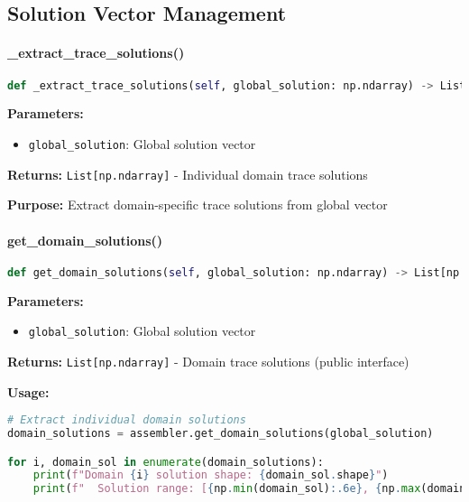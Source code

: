 \subsection{Solution Vector Management}
\label{subsec:solution_vector_management}

\paragraph{\_extract\_trace\_solutions()}\leavevmode
\begin{lstlisting}[language=Python, caption=Extract Trace Solutions Method]
def _extract_trace_solutions(self, global_solution: np.ndarray) -> List[np.ndarray]
\end{lstlisting}

\textbf{Parameters:}
\begin{itemize}
    \item \texttt{global\_solution}: Global solution vector
\end{itemize}

\textbf{Returns:} \texttt{List[np.ndarray]} - Individual domain trace solutions

\textbf{Purpose:} Extract domain-specific trace solutions from global vector

\paragraph{get\_domain\_solutions()}\leavevmode
\begin{lstlisting}[language=Python, caption=Get Domain Solutions Method]
def get_domain_solutions(self, global_solution: np.ndarray) -> List[np.ndarray]
\end{lstlisting}

\textbf{Parameters:}
\begin{itemize}
    \item \texttt{global\_solution}: Global solution vector
\end{itemize}

\textbf{Returns:} \texttt{List[np.ndarray]} - Domain trace solutions (public interface)

\textbf{Usage:}
\begin{lstlisting}[language=Python, caption=Solution Extraction Usage]
# Extract individual domain solutions
domain_solutions = assembler.get_domain_solutions(global_solution)

for i, domain_sol in enumerate(domain_solutions):
    print(f"Domain {i} solution shape: {domain_sol.shape}")
    print(f"  Solution range: [{np.min(domain_sol):.6e}, {np.max(domain_sol):.6e}]")
\end{lstlisting}


